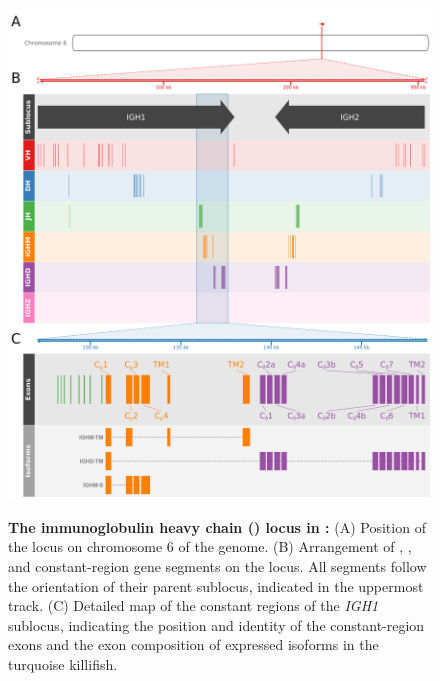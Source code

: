 \begin{figure}
	\centering
	\includegraphics[width=\textwidth]{_Figures/png/nfu-locus-map}
			    \begin{subfigure}{0em}
        \label{fig:nfu-locus-map-a}
    \end{subfigure}
    \begin{subfigure}{0em}
        \label{fig:nfu-locus-map-b}
    \end{subfigure}
    \begin{subfigure}{0em}
        \label{fig:nfu-locus-map-c}
        \end{subfigure}
	\caption[The immunoglobulin heavy chain (\igh{}) locus in \nfu]{\textbf{The immunoglobulin heavy chain (\igh{}) locus in \nfu:} (A) Position of the \igh{} locus on chromosome 6 of the \Nfu genome. (B) Arrangement of \vh, \dh, \jh and constant-region gene segments on the \Nfu \igh{} locus. All segments follow the orientation of their parent sublocus, indicated in the uppermost track. (C) Detailed map of the constant regions of the \textit{IGH1} sublocus, indicating the position and identity of the constant-region exons and the exon composition of expressed \igh{} isoforms in the turquoise killifish.}
	\label{fig:nfu-locus-map}
	\end{figure}
	
